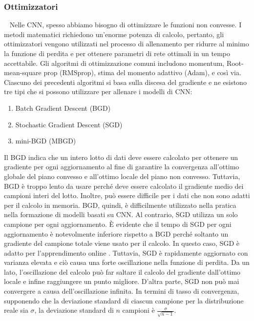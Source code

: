 \subsubsection{Ottimizzatori}~\newline
\label{subsubsec:optimizer}
Nelle CNN, spesso abbiamo bisogno di ottimizzare le funzioni non convesse. I metodi matematici richiedono un'enorme
potenza di calcolo, pertanto, gli ottimizzatori vengono utilizzati nel processo di allenamento per ridurre al minimo 
la funzione di perdita e per ottenere parametri di rete ottimali in un tempo accettabile. Gli algoritmi di
ottimizzazione comuni includono momentum, Root-mean-square prop (RMSprop), stima del momento adattivo (Adam), e
così via. Ciascuno dei precedenti algoritmi si basa sulla discesa del gradiente e ne esistono tre tipi che si possono
utilizzare per allenare i modelli di CNN:
\begin{enumerate}
    \item Batch Gradient Descent (BGD)
    \item Stochastic Gradient Descent (SGD)
    \item mini-BGD (MBGD)
\end{enumerate}
Il BGD indica che un intero lotto di dati deve essere calcolato per ottenere un gradiente per ogni aggiornamento al
fine di garantire la convergenza all'ottimo globale del piano convesso e all'ottimo locale del piano non convesso.
Tuttavia, BGD è troppo lento da usare perché deve essere calcolato il gradiente medio dei campioni interi del lotto.
Inoltre, può essere difficile per i dati che non sono adatti per il calcolo in memoria. BGD, quindi, è difficilmente
utilizzato nella pratica nella formazione di modelli basati su CNN. Al contrario, SGD utilizza un solo
campione per ogni aggiornamento. È evidente che il tempo di SGD per ogni aggiornamento è notevolmente inferiore 
rispetto a BGD perché soltanto un gradiente del campione totale viene usato per il calcolo. In questo caso, SGD è 
adatto per l'apprendimento online \cite{saad1999line}. Tuttavia, SGD è rapidamente aggiornato con varianza elevata 
e ciò causa una forte oscillazione nella funzione di perdita.
Da un lato, l'oscillazione del calcolo può far saltare il calcolo del gradiente dall'ottimo locale e infine 
raggiungere un punto migliore.
D'altra parte, SGD non può mai convergere a causa dell'oscillazione infinita. In termini di tasso di convergenza,
supponendo che la deviazione standard di ciascun campione per la distribuzione reale sia $\sigma$, la deviazione
standard di $n$ campioni è $\frac{\sigma}{\sqrt{n - 1}}$. 

